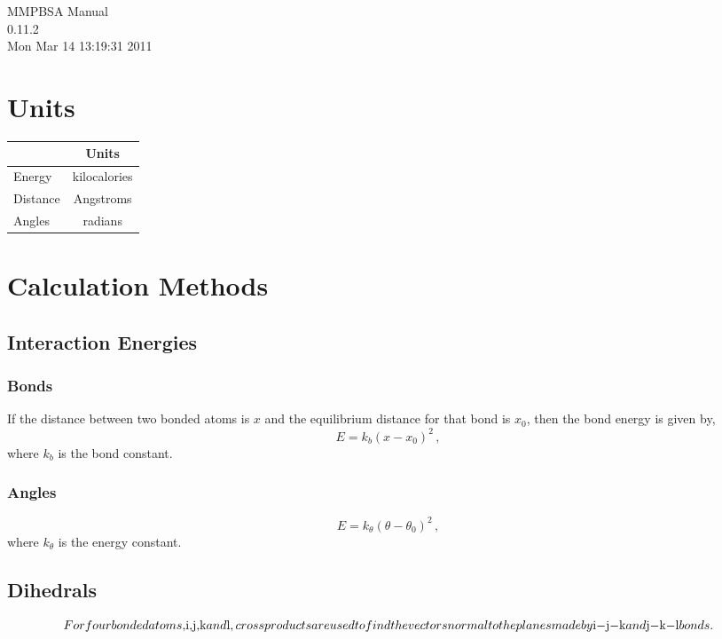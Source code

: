 \documentclass[a4paper,12pt]{article}
\begin{document}
\begin{titlepage}
\vspace*{7cm}
\begin{center}
{\Large MMPBSA Manual\\[1ex]\large 0.11.2 }\\
{\small Mon Mar 14 13:19:31 2011}\\
\end{center}
\end{titlepage}
\tableofcontents
{}
\newpage
\section{Units}
\begin{center}
\begin{tabular}[h]{|l|c|}
\hline
 & Units\\\hline
Energy & kilocalories\\\hline
Distance & Angstroms\\\hline
Angles & radians\\\hline
\end{tabular}
\end{center}
\section{Calculation Methods}
\subsection{Interaction Energies}
\subsubsection{Bonds}
If the distance between two bonded atoms is $x$ and the equilibrium distance for that bond is $x_0$, then the bond energy is given by,
\begin{equation}
\label{eqn:bond_energy}
E=k_b\left(x-x_0\right)^2 \,,
\end{equation}
where $k_b$ is the bond constant.
\subsubsection{Angles}
\begin{equation}
\label{eqn:angle_energy}
E=k_\theta\left(\theta - \theta_0\right)^2 \,,
\end{equation}
where $k_\theta$ is the energy constant.
\subsection{Dihedrals}
\begin{equation}
\label{eqn:dihedral_energy}
For four bonded atoms, $i$, $j$, $k$ and $l$, cross products are used to find the vectors normal to the planes made by $i$-$j$-$k$ and $j$-$k$-$l$ bonds. 
\end{equation}
\end{document}
